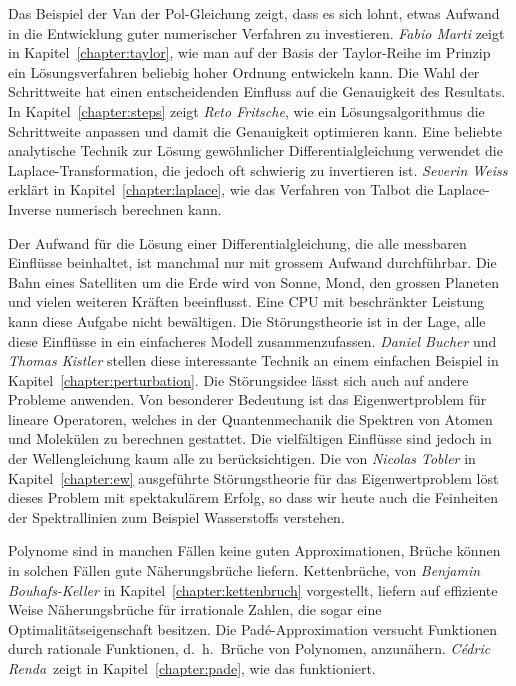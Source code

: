 Das Beispiel der Van der Pol-Gleichung zeigt, dass es sich lohnt,
etwas Aufwand in die Entwicklung guter numerischer Verfahren zu
investieren.
{\em Fabio Marti} zeigt in Kapitel~\ref{chapter:taylor}, wie man auf der
Basis der Taylor-Reihe im Prinzip ein Lösungsverfahren beliebig hoher Ordnung 
entwickeln kann.
Die Wahl der Schrittweite hat einen entscheidenden Einfluss auf die
Genauigkeit des Resultats. In Kapitel~\ref{chapter:steps} zeigt
{\em Reto Fritsche}, wie ein Lösungsalgorithmus die Schrittweite
anpassen und damit die Genauigkeit optimieren kann.
Eine beliebte analytische Technik zur Lösung gewöhnlicher Differentialgleichung
verwendet die Laplace-Transformation, die jedoch oft schwierig zu
invertieren ist.
{\em Severin Weiss} erklärt in Kapitel~\ref{chapter:laplace}, wie 
das Verfahren von Talbot die Laplace-Inverse numerisch berechnen kann.

Der Aufwand für die Lösung einer Differentialgleichung, die alle
messbaren Einflüsse beinhaltet, ist manchmal nur mit grossem Aufwand
durchführbar.
Die Bahn eines Satelliten um die Erde wird von Sonne, Mond, den grossen
Planeten und vielen weiteren Kräften beeinflusst.
Eine CPU mit beschränkter Leistung kann diese Aufgabe nicht bewältigen.
Die Störungstheorie ist in der Lage, alle diese Einflüsse in ein einfacheres
Modell zusammenzufassen.
{\em Daniel Bucher} und {\em Thomas Kistler} stellen diese interessante
Technik an einem einfachen Beispiel in Kapitel~\ref{chapter:perturbation}.
Die Störungsidee lässt sich auch auf andere Probleme anwenden.
Von besonderer Bedeutung ist das Eigenwertproblem für lineare Operatoren,
welches in der Quantenmechanik die Spektren von Atomen und Molekülen
zu berechnen gestattet.
Die vielfältigen Einflüsse sind jedoch in der Wellengleichung kaum
alle zu berücksichtigen.
Die von {\em Nicolas Tobler} in Kapitel~\ref{chapter:ew} ausgeführte
Störungstheorie für das Eigenwertproblem löst dieses Problem mit
spektakulärem Erfolg, so dass wir heute auch die Feinheiten der
Spektrallinien zum Beispiel Wasserstoffs verstehen.

Polynome sind in manchen Fällen keine guten Approximationen,
Brüche können in solchen Fällen gute Näherungsbrüche liefern.
Kettenbrüche, von {\em Benjamin Bouhafs-Keller} in
Kapitel~\ref{chapter:kettenbruch} vorgestellt, liefern auf effiziente
Weise Näherungsbrüche für irrationale Zahlen, die sogar eine
Optimalitätseigenschaft besitzen.
Die Padé-Approximation versucht Funktionen durch rationale
Funktionen, d.~h.~Brüche von Polynomen, anzunähern.
{\em Cédric Renda} zeigt in Kapitel~\ref{chapter:pade}, wie das
funktioniert.


